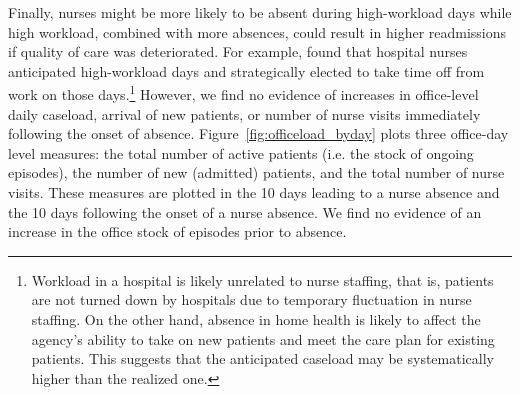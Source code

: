 \documentclass[final,12pt, notitlepage]{article}
\begin{document}



Finally, nurses might be more likely to be absent during high-workload days while high workload, combined with more absences, could result in higher readmissions if quality of care was deteriorated.
For example, \citet{Green2013} found that hospital nurses anticipated high-workload days and strategically elected to take time off from work on those days.\footnote{Workload in a hospital is likely unrelated to nurse staffing, that is, patients are not turned down by hospitals due to temporary fluctuation in nurse staffing. On the other hand, absence in home health is likely to affect the agency's ability to take on new patients and meet the care plan for existing patients. This suggests that the anticipated caseload may be systematically higher than the realized one.}
However, we find no evidence of increases in office-level daily caseload, arrival of new patients, or number of nurse visits immediately following the onset of absence.
Figure~\ref{fig:officeload_byday} plots three office-day level measures: the total number of active patients (i.e. the stock of ongoing episodes), the number of new (admitted) patients, and the total number of nurse visits. These measures are plotted in the 10 days leading to a nurse absence and the 10 days following the onset of a nurse absence.
We find no evidence of an increase in the office stock of episodes prior to absence.
\end{document}
